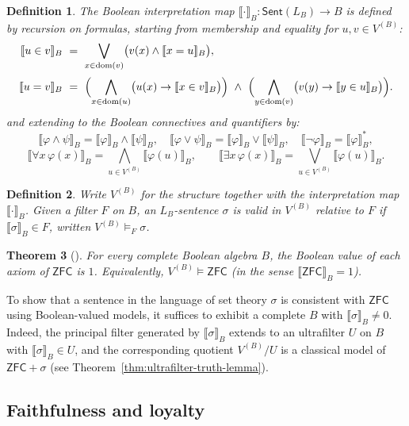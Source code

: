 \documentclass[10pt,a4paper]{amsart}
\newtheorem{definition}{Definition}[section]
\newtheorem{theorem}[definition]{Theorem}
\newcommand{\Sent}{\mathsf{Sent}}
\newcommand{\LB}{L_B}     %
\newcommand{\val}[1]{\llbracket #1\rrbracket_B}
\begin{document}
\begin{definition}\label{def:boolean-interpretation}
The Boolean interpretation map $\val{\cdot}:\Sent(L_B)\to B$ is defined by recursion on formulas, starting
from membership and equality for $u,v\in V^{(B)}$:
\[
\begin{aligned}
\val{u\in v} \ &=\ \bigvee_{x\in\mathrm{dom}(v)}\bigl(v(x)\wedge \val{x=u}\bigr),\\[2pt]
\val{u=v} \ &=\ \Bigl(\bigwedge_{x\in\mathrm{dom}(u)}\bigl(u(x)\to \val{x\in v}\bigr)\Bigr)\ \wedge\
            \Bigl(\bigwedge_{y\in\mathrm{dom}(v)}\bigl(v(y)\to \val{y\in u}\bigr)\Bigr).
\end{aligned}
\]
and extending to the Boolean connectives and quantifiers by:
\[
\val{\varphi\wedge\psi}=\val{\varphi}\wedge\val{\psi},\quad
\val{\varphi\vee\psi}=\val{\varphi}\vee\val{\psi},\quad
\val{\neg\varphi}=\val{\varphi}^\ast,
\]
\[
\val{\forall x\,\varphi(x)}=\bigwedge_{u\in V^{(B)}}\val{\varphi(u)},
\qquad
\val{\exists x\,\varphi(x)}=\bigvee_{u\in V^{(B)}}\val{\varphi(u)}.
\]
\end{definition}

\begin{definition}
Write $V^{(B)}$ for the structure together with the interpretation map $\val{\cdot}$.
Given a filter $F$ on $B$, an $\LB$-sentence $\sigma$ is \emph{valid in $V^{(B)}$ relative to $F$} if
$\val{\sigma}\in F$, written $V^{(B)}\models_F \sigma$.
\end{definition}

\begin{theorem}[\cite{Bell}]\label{thm:zfc-boolean}
For every complete Boolean algebra $B$, the Boolean value of each axiom of $\mathsf{ZFC}$ is $1$.
Equivalently, $V^{(B)}\models \mathsf{ZFC}$ (in the sense $\val{\mathsf{ZFC}}=1$).
\end{theorem}

To show that a sentence in the language of set theory $\sigma$ is consistent with $\mathsf{ZFC}$ using Boolean-valued
models, it suffices to exhibit a complete $B$ with $\val{\sigma}\ne 0$.
Indeed, the principal filter generated by $\val{\sigma}$ extends to an ultrafilter $U$ on $B$ with
$\val{\sigma}\in U$, and the corresponding quotient $V^{(B)}/U$ is a classical model of $\mathsf{ZFC}+\sigma$
(see Theorem~\ref{thm:ultrafilter-truth-lemma}).

\subsection{Faithfulness and loyalty}
\end{document}
